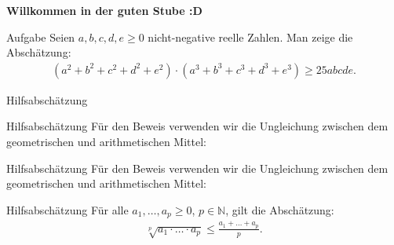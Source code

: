 \documentclass[10pt]{beamer}
\title{}
\author{Artur's Mathematikstübchen}
\date{}
\def\bN{\mathbb{N}}
\begin{document}

\begin{frame}
    \begin{center}
        \textbf{\huge Willkommen in der guten Stube \newline \newline :D}
    \end{center}
\end{frame}




\begin{frame}
    \begin{alertblock}{Aufgabe}
        Seien \( a, b, c, d, e \geq 0 \) nicht-negative reelle Zahlen. Man zeige die Abschätzung:
        \begin{align*}
            \left( a^{2} + b^{2} + c^{2} + d^{2} + e^{2} \right) \cdot \left( a^{3} + b^{3} + c^{3} + d^{3} + e^{3} \right)
            \geq 25abcde.
        \end{align*}
    \end{alertblock}
\end{frame}



\begin{frame}{Hilfsabschätzung}
    
\end{frame}



\begin{frame}{Hilfsabschätzung}
    Für den Beweis verwenden wir die Ungleichung zwischen dem geometrischen und arithmetischen Mittel:
\end{frame}



\begin{frame}{Hilfsabschätzung}
    Für den Beweis verwenden wir die Ungleichung zwischen dem geometrischen und arithmetischen Mittel:
    \begin{block}{Hilfsabschätzung}
        Für alle \( a_{1}, \ldots, a_{p} \geq 0 \), \( p \in \bN \), gilt die Abschätzung:
        \begin{align*}
            \sqrt[p]{a_{1} \cdot \ldots \cdot a_{p}} 
            \leq \frac{a_{1} + \ldots + a_{p}}{p}.
        \end{align*}
    \end{block}
\end{frame}
\end{document}

